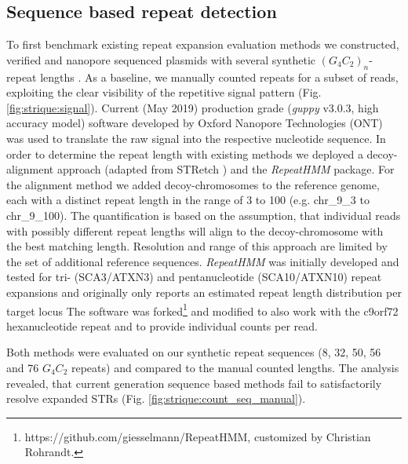 \subsection{Sequence based repeat detection}
\label{subsec:strique:seq_repeat_counts}

To first benchmark existing repeat expansion evaluation methods we constructed, verified and nanopore sequenced plasmids with several synthetic $ (G_{4}C_{2})_{n} $-repeat lengths \cite{Mizielinska2014}. As a baseline, we manually counted repeats for a subset of reads, exploiting the clear visibility of the repetitive signal pattern (Fig. \ref{fig:strique:signal}). Current (May 2019) production grade (\textit{guppy} v3.0.3, high accuracy model) software developed by Oxford Nanopore Technologies (ONT) was used to translate the raw signal into the respective nucleotide sequence. In order to determine the repeat length with existing methods we deployed a decoy-alignment approach (adapted from STRetch \cite{Dashnow2018}) and the \textit{RepeatHMM} \cite{Liu2017} package. For the alignment method we added decoy-chromosomes to the reference genome, each with a distinct repeat length in the range of 3 to 100 (e.g. chr\_9\_3 to chr\_9\_100). The quantification is based on the assumption, that individual reads with possibly different repeat lengths will align to the decoy-chromosome with the best matching length. Resolution and range of this approach are limited by the set of additional reference sequences.
\textit{RepeatHMM} was initially developed and tested for tri- (SCA3/ATXN3) and pentanucleotide (SCA10/ATXN10) repeat expansions and originally only reports an estimated repeat length distribution per target locus The software was forked\footnote{https://github.com/giesselmann/RepeatHMM, customized by Christian Rohrandt.} and modified to also work with the c9orf72 hexanucleotide repeat and to provide individual counts per read.

Both methods were evaluated on our synthetic repeat sequences (8, 32, 50, 56 and 76 $ G_{4}C_{2} $ repeats) and compared to the manual counted lengths. The analysis revealed, that current generation sequence based methods fail to satisfactorily resolve expanded STRs (Fig. \ref{fig:strique:count_seq_manual}).


